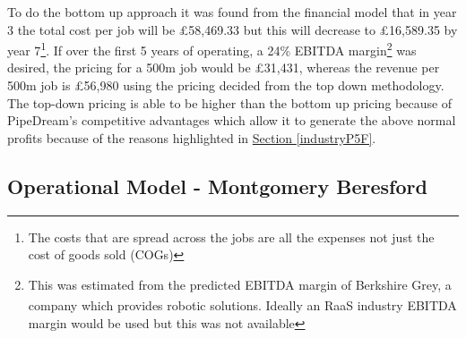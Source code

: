 \documentclass[11pt]{article}		%
\newcommand{\supercite}[1]{\textsuperscript{\cite{#1}}}		%
\newcommand{\sectref}[1]{\hyperref[#1]{Section \ref*{#1}}}     %
\begin{document}
            To do the bottom up approach it was found from the financial model  that in year 3 the total cost per job will be £58,469.33 but this will decrease to £16,589.35 by year 7\footnote{The costs that are spread across the jobs are all the expenses not just the cost of goods sold (COGs)}. If over the first 5 years of operating, a 24\% EBITDA margin\footnote{This was estimated from the predicted EBITDA margin of Berkshire Grey, a company which provides robotic solutions\supercite{Berkshire}. Ideally an RaaS industry EBITDA margin would be used but this was not available} was desired, the pricing for a 500m job would be £31,431, whereas the revenue per 500m job is £56,980 using the pricing decided from the top down methodology. The top-down pricing is able to be higher than the bottom up pricing because of PipeDream's competitive advantages which allow it to generate the above normal profits because of the reasons highlighted in \sectref{industryP5F}.
        
           \subsection[Operational Model]{Operational Model - Montgomery Beresford}
	        
\end{document}
